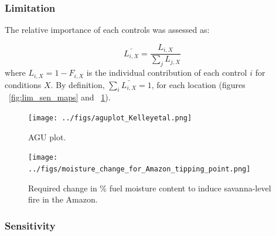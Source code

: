 \subsubsection{Limitation}

The relative importance of each controls was assessed as:

\begin{equation}
    \bar{L_{i, X}} = \frac{L_{i, X}}{\sum_{j} L_{j, X}}
\end{equation}
where $L_{i, X} = 1 - F_{i,X}$ is the individual contribution of each control $i$ for conditions $X$. By definition, $\sum_{i} \bar{L_{i,X}} = 1$, for each location (figures ~\ref{fig:lim_sen_maps} and ~\ref{fig:agu_plot}).


\begin{figure}[!ht]
  \centering
    \texttt{[image: ../figs/aguplot\_Kelleyetal.png]}

  \caption{AGU plot.}
  \label{fig:agu_plot}
\end{figure}


\begin{figure}[!ht]
  \centering
    \texttt{[image: ../figs/moisture\_change\_for\_Amazon\_tipping\_point.png]}

  \caption{Required change in \% fuel moisture content to induce savanna-level fire in the Amazon.}
  \label{fig:amazon}
\end{figure}

\subsubsection{Sensitivity}


